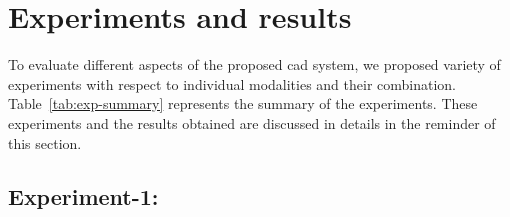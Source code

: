 \section{Experiments and results}\label{sec:chp6:exp-res}
To evaluate different aspects of the proposed \ac{cad} system, we proposed variety of experiments with respect to individual modalities and their combination. 
Table~\ref{tab:exp-summary} represents the summary of the experiments. 
These experiments and the results obtained are discussed in details in the reminder of this section. 

\subsection{Experiment-1:}\label{subec:chp6:exp-res:Ex1} 
